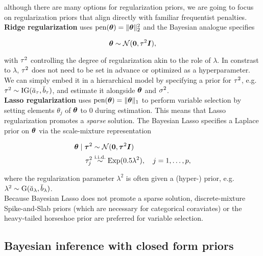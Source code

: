 although there are many options for regularization priors, we are going to focus on regularization priors that align directly with familiar frequentist penalties.\\

\textbf{Ridge regularization} \citep{hoerl_ridge_1970,hoerl_ridge_1970-1} uses $\text{pen}(\bm{\theta}) = \|\bm{\theta}\|_2^2$ and the Bayesian analogue  specifies

\begin{equation*}
    \bm{\theta} \sim \mathcal{N}(\bm{0}, \tau^2 \bm{I}),
\end{equation*}

with $\tau^2$ controlling the degree of regularization akin to the role of $\lambda$.
In constrast to $\lambda$, $\tau^2$ does not need to be set in advance or optimized as a hyperparameter.
We can simply embed it in a hierarchical model by specifying a prior for $\tau^2$, e.g. $\tau^2 \sim \text{IG}(\breve{a}_\tau, \breve{b}_\tau)$, and estimate it alongside $\bm{\theta}$ and $\sigma^2$.\\

\textbf{Lasso regularization} \citep{tibshirani_regression_1996} uses $\text{pen}(\bm{\theta}) = \|\bm{\theta}\|_1$ to perform variable selection by setting elements $\theta_j$ of $\bm{\theta}$ to $0$ during estimation.
This means that Lasso regularization promotes a \textit{sparse} solution.
The Bayesian Lasso specifies a Laplace prior on $\bm{\theta}$ via the scale-mixture representation \citep{park_bayesian_2008}

\begin{equation}
    \begin{aligned}
        \bm{\theta} \mid \bm{\tau}^2 &\sim \mathcal{N}(\bm{0}, \bm{\tau}^2 \bm{I}) \\
        \tau^2_j &\overset{\text{i.i.d.}}{\sim} \text{Exp}(0.5 \lambda^2), \quad j = 1, \dots, p,
    \end{aligned}
\end{equation}

where the regularization parameter $\lambda^2$ is often given a (hyper-) prior, e.g. $\lambda^2 \sim \text{G}(\breve{a}_\lambda, \breve{b}_\lambda)$.\\

Because Bayesian Lasso does not promote a sparse solution, discrete-mixture Spike-and-Slab priors \citep{mitchell_bayesian_1988} (which are necessary for categorical coraviates) or the heavy-tailed horseshoe prior \citep{carvalho_horseshoe_2010} are preferred for variable selection.

\subsection{Bayesian inference with closed form priors}

